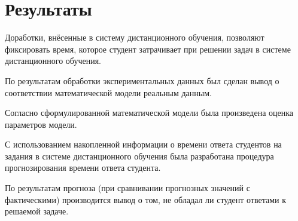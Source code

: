  \chapter{Результаты}
 \label{ch5}

Доработки, внёсенные в систему дистанционного обучения, позволяют фиксировать время, которое студент затрачивает при решении задач в системе дистанционного обучения.

По результатам обработки экспериментальных данных был сделан вывод о соответствии математической модели реальным данным.

Согласно сформулированной математической модели была произведена оценка параметров модели.

С использованием накопленной информации о времени ответа студентов на задания в системе дистанционного обучения была разработана процедура прогнозирования времени ответа студента.

По результатам прогноза (при сравнивании прогнозных значений с фактическими) производится вывод о том, не обладал ли студент ответами к решаемой задаче.
